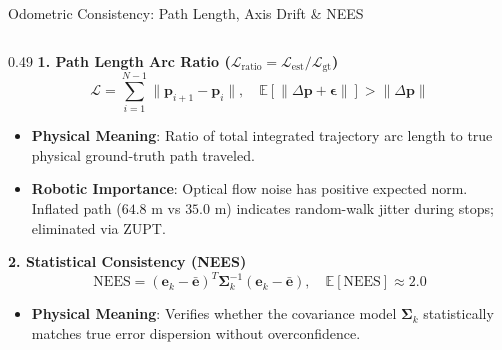 \documentclass[aspectratio=169, 10pt]{beamer}
\begin{document}
\begin{frame}{Odometric Consistency: Path Length, Axis Drift \& NEES}
  \begin{columns}[T]
    \begin{column}{0.49\textwidth}
      {\small \textbf{\textcolor{NavyBlue}{1. Path Length Arc Ratio ($\mathcal{L}_{\text{ratio}} = \mathcal{L}_{\text{est}} / \mathcal{L}_{\text{gt}}$)}}}
      \vspace{0.05cm}
      \begin{equation}
        \mathcal{L} = \sum_{i=1}^{N-1} \|\mathbf{p}_{i+1} - \mathbf{p}_i\|, \quad \mathbb{E}[\|\Delta \mathbf{p} + \boldsymbol{\epsilon}\|] > \|\Delta \mathbf{p}\|
      \end{equation}
      \scriptsize
      \begin{itemize}
        \setlength{\itemsep}{1pt}
        \item \textbf{Physical Meaning}: Ratio of total integrated trajectory arc length to true physical ground-truth path traveled.
        \item \textbf{Robotic Importance}: Optical flow noise has positive expected norm. Inflated path ($64.8\text{ m}$ vs $35.0\text{ m}$) indicates random-walk jitter during stops; eliminated via ZUPT.
      \end{itemize}

      \vspace{0.06cm}
      {\small \textbf{\textcolor{NavyBlue}{2. Statistical Consistency (NEES)}}}
      \begin{equation}
        \text{NEES} = (\mathbf{e}_k - \bar{\mathbf{e}})^T \mathbf{\Sigma}_k^{-1} (\mathbf{e}_k - \bar{\mathbf{e}}), \quad \mathbb{E}[\text{NEES}] \approx 2.0
      \end{equation}
      \scriptsize
      \begin{itemize}
        \setlength{\itemsep}{1pt}
        \item \textbf{Physical Meaning}: Verifies whether the covariance model $\mathbf{\Sigma}_k$ statistically matches true error dispersion without overconfidence.
      \end{itemize}
    \end{column}


\end{columns}
\end{frame}
\end{document}
